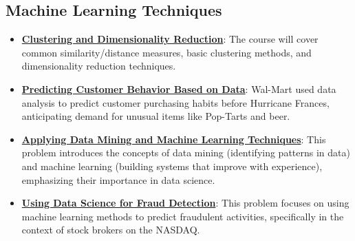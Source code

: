 \documentclass{article}%
\begin{document}
\subsection{Machine Learning Techniques}%
\label{subsec:MachineLearningTechniques}%
\begin{itemize}[leftmargin=*]%
\item \href{https://purdue.brightspace.com/d2l/common/assets/pdfjs-d2l-dist/1.0.14-legacy/web/viewer.html?file=\%2Fcontent\%2Fenforced\%2F1095465-WL.202510.CS24200.LE1\%2F01L1-introduction.pdf\%3Fou\%3D1095465\&lang=en-us\&container=d2l-fileviewer-rendered-pdf\&fullscreen=d2l-fileviewer-rendered-pdf-dialog\&height=667#page=4}{\textbf{Clustering and Dimensionality Reduction}}: The course will cover common similarity/distance measures, basic clustering methods, and dimensionality reduction techniques.%
\item \href{https://purdue.brightspace.com/d2l/common/assets/pdfjs-d2l-dist/1.0.14-legacy/web/viewer.html?file=\%2Fcontent\%2Fenforced\%2F1095465-WL.202510.CS24200.LE1\%2F02L1-datas-intro.pdf\%3Fou\%3D1095465\&lang=en-us\&container=d2l-fileviewer-rendered-pdf\&fullscreen=d2l-fileviewer-rendered-pdf-dialog\&height=667#page=5}{\textbf{Predicting Customer Behavior Based on Data}}: Wal-Mart used data analysis to predict customer purchasing habits before Hurricane Frances, anticipating demand for unusual items like Pop-Tarts and beer.%
\item \href{https://purdue.brightspace.com/d2l/common/assets/pdfjs-d2l-dist/1.0.14-legacy/web/viewer.html?file=\%2Fcontent\%2Fenforced\%2F1095465-WL.202510.CS24200.LE1\%2F02L1-datas-intro.pdf\%3Fou\%3D1095465\&lang=en-us\&container=d2l-fileviewer-rendered-pdf\&fullscreen=d2l-fileviewer-rendered-pdf-dialog\&height=667#page=7}{\textbf{Applying Data Mining and Machine Learning Techniques}}: This problem introduces the concepts of data mining (identifying patterns in data) and machine learning (building systems that improve with experience), emphasizing their importance in data science.%
\item \href{https://purdue.brightspace.com/d2l/common/assets/pdfjs-d2l-dist/1.0.14-legacy/web/viewer.html?file=\%2Fcontent\%2Fenforced\%2F1095465-WL.202510.CS24200.LE1\%2F02L1-datas-intro.pdf\%3Fou\%3D1095465\&lang=en-us\&container=d2l-fileviewer-rendered-pdf\&fullscreen=d2l-fileviewer-rendered-pdf-dialog\&height=667#page=13}{\textbf{Using Data Science for Fraud Detection}}: This problem focuses on using machine learning methods to predict fraudulent activities, specifically in the context of stock brokers on the NASDAQ.%

\end{itemize}
\end{document}
